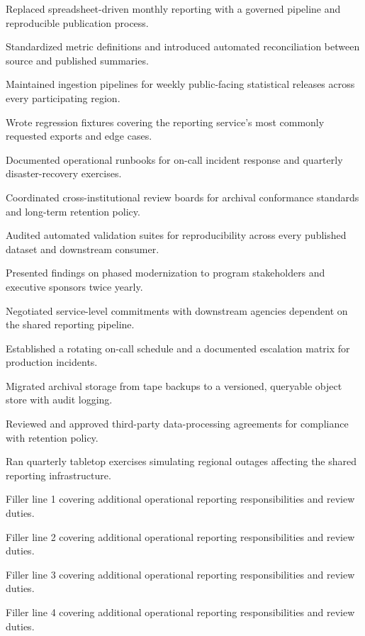 \documentclass[fontsize=11pt, margin=narrow, medium=print]{careerdossier-resume}
\begin{document}
\begin{CDossierEntry}[title = {Modernization Program}, organization = {Continental Reliability Consortium}, location = {Ottawa, ON}, dates = {2019--Present}]
\begin{CDossierItemize}
    \item Replaced spreadsheet-driven monthly reporting with a governed pipeline and reproducible publication process.
    \item Standardized metric definitions and introduced automated reconciliation between source and published summaries.
    \item Maintained ingestion pipelines for weekly public-facing statistical releases across every participating region.
    \item Wrote regression fixtures covering the reporting service's most commonly requested exports and edge cases.
    \item Documented operational runbooks for on-call incident response and quarterly disaster-recovery exercises.
    \item Coordinated cross-institutional review boards for archival conformance standards and long-term retention policy.
    \item Audited automated validation suites for reproducibility across every published dataset and downstream consumer.
    \item Presented findings on phased modernization to program stakeholders and executive sponsors twice yearly.
    \item Negotiated service-level commitments with downstream agencies dependent on the shared reporting pipeline.
    \item Established a rotating on-call schedule and a documented escalation matrix for production incidents.
    \item Migrated archival storage from tape backups to a versioned, queryable object store with audit logging.
    \item Reviewed and approved third-party data-processing agreements for compliance with retention policy.
    \item Ran quarterly tabletop exercises simulating regional outages affecting the shared reporting infrastructure.
    \item Filler line 1 covering additional operational reporting responsibilities and review duties.
    \item Filler line 2 covering additional operational reporting responsibilities and review duties.
    \item Filler line 3 covering additional operational reporting responsibilities and review duties.
    \item Filler line 4 covering additional operational reporting responsibilities and review duties.

\end{CDossierItemize}
\end{CDossierEntry}
\end{document}
